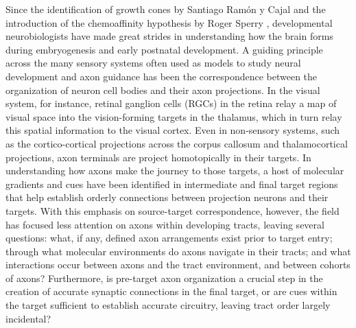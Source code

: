 Since the identification of growth cones by Santiago Ram\'on y Cajal and the introduction of the chemoaffinity hypothesis by Roger Sperry \cite{sperry1963chemoaffinity}, developmental neurobiologists have made great strides in understanding how the brain forms during embryogenesis and early postnatal development.
A guiding principle across the many sensory systems often used as models to study neural development and axon guidance has been the correspondence between the organization of neuron cell bodies and their axon projections.
In the visual system, for instance, retinal ganglion cells (RGCs) in the retina relay a map of visual space into the vision-forming targets in the thalamus, which in turn relay this spatial information to the visual cortex.
Even in non-sensory systems, such as the cortico-cortical projections across the corpus callosum and thalamocortical projections, axon terminals are project homotopically in their targets. %
In understanding how axons make the journey to those targets, a host of molecular gradients and cues have been identified in intermediate and final target regions that help establish orderly connections between projection neurons and their targets.
With this emphasis on source-target correspondence, however, the field has focused less attention on axons within developing tracts, leaving several questions: what, if any, defined axon arrangements exist prior to target entry; through what molecular environments do axons navigate in their tracts; and what interactions occur between axons and the tract environment, and between cohorts of axons?
Furthermore, is pre-target axon organization a crucial step in the creation of accurate synaptic connections in the final target, or are cues within the target sufficient to establish accurate circuitry, leaving tract order largely incidental?

